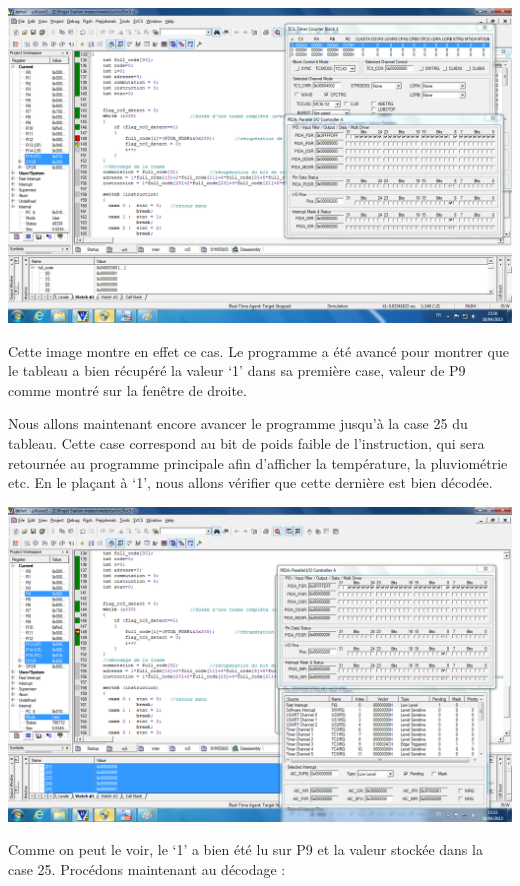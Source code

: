 \documentclass[a4paper]{report}
\begin{document}
\begin{center}
	\includegraphics[scale=0.3]{images/RC_simu5.png}
\end{center}

Cette image montre en effet ce cas.
Le programme a été avancé pour montrer que le tableau a bien récupéré la valeur ‘1’ dans sa première case, valeur de P9 comme montré sur la fenêtre de droite.

Nous allons maintenant encore avancer le programme jusqu’à la case 25 du tableau.
Cette case correspond au bit de poids faible de l’instruction, qui sera retournée au programme principale afin d’afficher la température, la pluviométrie etc.
En le plaçant à ‘1’, nous allons vérifier que cette dernière est bien décodée.

\begin{center}
	\includegraphics[scale=0.3]{images/RC_simu6.png}
\end{center}

Comme on peut le voir, le ‘1’ a bien été lu sur P9 et la valeur stockée dans la case 25.
Procédons maintenant au décodage :
\end{document}
